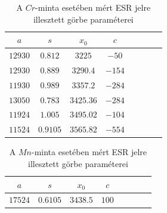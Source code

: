 \documentclass[12pt]{article}
\begin{document}
\begin{center}
\begin{table}[H]
\begin{tabular}{|c|c|c|c|c|c|c|c|}
 \hline
$a$ & $s$ & $x_0$ & $c$ \\ \hline
$12930$ & $0.812$ & $3225$ & $-50$ \\ \hline
$12930$ & $0.889$ & $3290.4$ & $-154$ \\ \hline
$11930$ & $0.989$ & $3357.2$ & $-284$ \\ \hline
$13050$ & $0.783$ & $3425.36$ & $-284$ \\ \hline
$11924$ & $1.005$ & $3495.02$ & $-104$ \\ \hline
$11524$ & $0.9105$ & $3565.82$ & $-554$ \\ \hline
\end{tabular}
\caption{A $Cr$-minta esetében mért ESR jelre illesztett görbe paraméterei}
\label{tab:1}
\end{table}
\end{center}

\begin{center}
\begin{table}[H]
\begin{tabular}{|c|c|c|c|c|c|c|c|}
 \hline
$a$ & $s$ & $x_0$ & $c$ \\ \hline
$17524$ & $0.6105$ & $3438.5$ & $100$ \\ \hline
\end{tabular}
\caption{A $Mn$-minta esetében mért ESR jelre illesztett görbe paraméterei}
\label{tab:2}
\end{table}
\end{center}
\end{document}
